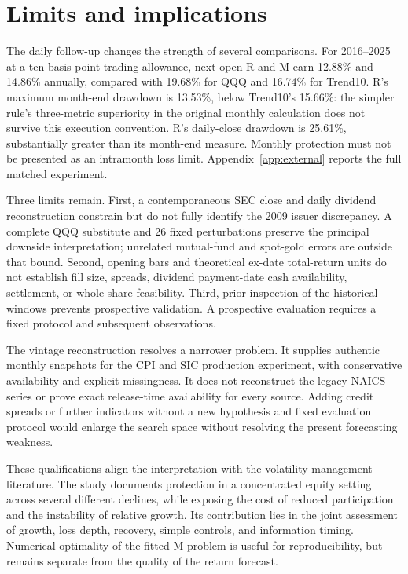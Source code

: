 \documentclass[12pt,letterpaper]{article}
\begin{document}
\section{Limits and implications}
The daily follow-up changes the strength of several comparisons. For 2016--2025 at a ten-basis-point trading allowance, next-open R and M earn 12.88\% and 14.86\% annually, compared with 19.68\% for QQQ and 16.74\% for Trend10. R's maximum month-end drawdown is 13.53\%, below Trend10's 15.66\%: the simpler rule's three-metric superiority in the original monthly calculation does not survive this execution convention. R's daily-close drawdown is 25.61\%, substantially greater than its month-end measure. Monthly protection must not be presented as an intramonth loss limit. Appendix~\ref{app:external} reports the full matched experiment.

Three limits remain. First, a contemporaneous SEC close and daily dividend reconstruction constrain but do not fully identify the 2009 issuer discrepancy. A complete QQQ substitute and 26 fixed perturbations preserve the principal downside interpretation; unrelated mutual-fund and spot-gold errors are outside that bound. Second, opening bars and theoretical ex-date total-return units do not establish fill size, spreads, dividend payment-date cash availability, settlement, or whole-share feasibility. Third, prior inspection of the historical windows prevents prospective validation. A prospective evaluation requires a fixed protocol and subsequent observations.

The vintage reconstruction resolves a narrower problem. It supplies authentic monthly snapshots for the CPI and SIC production experiment, with conservative availability and explicit missingness. It does not reconstruct the legacy NAICS series or prove exact release-time availability for every source. Adding credit spreads or further indicators without a new hypothesis and fixed evaluation protocol would enlarge the search space without resolving the present forecasting weakness.

These qualifications align the interpretation with the volatility-management literature. The study documents protection in a concentrated equity setting across several different declines, while exposing the cost of reduced participation and the instability of relative growth. Its contribution lies in the joint assessment of growth, loss depth, recovery, simple controls, and information timing. Numerical optimality of the fitted M problem is useful for reproducibility, but remains separate from the quality of the return forecast.
\end{document}
